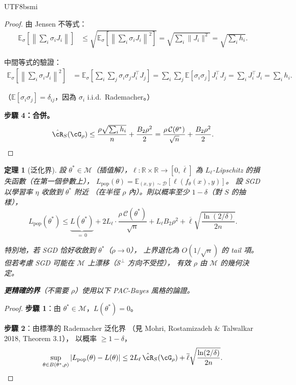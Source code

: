 \documentclass[11pt,a4paper]{article}
\newtheorem{theorem}{定理}
\theoremstyle{definition}
\newcommand{\R}{\mathbb{R}}
\newcommand{\E}{\mathbb{E}}
\newcommand{\cM}{\mathcal{M}}
\newcommand{\cS}{\mathcal{S}}
\newcommand{\cD}{\mathcal{D}}
\newcommand{\cC}{\mathcal{C}}
\begin{document}
\begin{CJK}{UTF8}{bsmi}
\begin{proof}
  由 Jensen 不等式：
  \begin{align*}
    \E_\sigma\left[\left\|\sum_i\sigma_i J_i\right\|\right]
    &\leq \sqrt{\E_\sigma\left[\left\|\sum_i\sigma_i J_i\right\|^2\right]}
    = \sqrt{\sum_i\|J_i\|^2}
    = \sqrt{\sum_i h_i}.
  \end{align*}

  中間等式的驗證：
  \begin{align*}
    \E_\sigma\left[\left\|\sum_i\sigma_i J_i\right\|^2\right]
    &= \E_\sigma\left[\sum_i\sum_j\sigma_i\sigma_j J_i^\top J_j\right]
    = \sum_i\sum_j\E[\sigma_i\sigma_j]J_i^\top J_j
    = \sum_i J_i^\top J_i = \sum_i h_i.
  \end{align*}

  （$\E[\sigma_i\sigma_j]=\delta_{ij}$，因為 $\sigma_i$ i.i.d.\ Rademacher。）

  \textbf{步驟 4：合併。}
  \[
    \hat{\cR}_S(\cG_\rho) \leq \frac{\rho\sqrt{\sum_i h_i}}{n} + \frac{B_2\rho^2}{2}
    = \frac{\rho\,\cC(\theta^*)}{\sqrt{n}} + \frac{B_2\rho^2}{2}.
  \]
\end{proof}

\begin{theorem}[泛化界]\label{thm:gen}
  設 $\theta^*\in\cM$（插值解），$\ell:\R\times\R\to[0,\overline{\ell}]$ 為 $L_\ell$-Lipschitz
  的損失函數（在第一個參數上），
  $L_{\mathrm{pop}}(\theta)=\E_{(x,y)\sim\cD}[\ell(f_\theta(x),y)]$。
  設 SGD 以學習率 $\eta$ 收斂到 $\theta^*$ 附近
  （在半徑 $\rho$ 內）。則以概率至少 $1-\delta$（對 $S$ 的抽樣），
  \begin{equation}\label{eq:gen-bound}
    L_{\mathrm{pop}}(\theta^*) \leq \underbrace{L(\theta^*)}_{=\,0}
    + 2L_\ell\cdot\frac{\rho\,\cC(\theta^*)}{\sqrt{n}} + L_\ell B_2\rho^2
    + \overline{\ell}\sqrt{\frac{\ln(2/\delta)}{2n}}.
  \end{equation}

  特別地，若 SGD 恰好收斂到 $\theta^*$（$\rho\to 0$），
  上界退化為 $O(1/\sqrt{n})$ 的 tail 項。
  但若考慮 SGD 可能在 $\cM$ 上漂移（$\cS^\perp$ 方向不受控），
  有效 $\rho$ 由 $\cM$ 的幾何決定。

  \textbf{更精確的界}（不需要 $\rho$）使用以下 PAC-Bayes 風格的論證。
\end{theorem}

\begin{proof}
  \textbf{步驟 1}：由 $\theta^*\in\cM$，$L(\theta^*)=0$。

  \textbf{步驟 2}：由標準的 Rademacher 泛化界
  （見 Mohri, Rostamizadeh \& Talwalkar 2018, Theorem 3.1），
  以概率 $\geq 1-\delta$，
  \[
    \sup_{\theta\in B(\theta^*,\rho)}\left|L_{\mathrm{pop}}(\theta)-L(\theta)\right|
    \leq 2L_\ell\,\hat{\cR}_S(\cG_\rho) + \overline{\ell}\sqrt{\frac{\ln(2/\delta)}{2n}}.
  \]


\end{proof}
\end{CJK}
\end{document}
